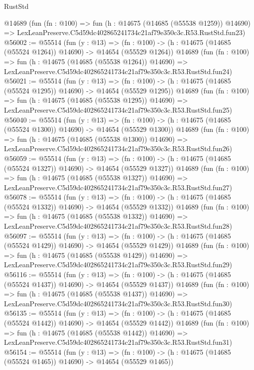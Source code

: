 \begin{lexlean}{RustStd}
\begin{coremodule}
    @14689
    (fun (fn : @100) =>
    fun (h : @14675 (@14685 (@55538 @1259)) @14690) =>
    LexLeanPreserve.C5d59dc402865241734c21af79e350c3c.R53.RustStd.fun23)
@56002 := @55514
    (fun (y : @13) =>
    (fn : @100) -> (h : @14675 (@14685 (@55524 @1264)) @14690) -> @14654 (@55529 @1264))
    @14689
    (fun (fn : @100) =>
    fun (h : @14675 (@14685 (@55538 @1264)) @14690) =>
    LexLeanPreserve.C5d59dc402865241734c21af79e350c3c.R53.RustStd.fun24)
@56021 := @55514
    (fun (y : @13) =>
    (fn : @100) -> (h : @14675 (@14685 (@55524 @1295)) @14690) -> @14654 (@55529 @1295))
    @14689
    (fun (fn : @100) =>
    fun (h : @14675 (@14685 (@55538 @1295)) @14690) =>
    LexLeanPreserve.C5d59dc402865241734c21af79e350c3c.R53.RustStd.fun25)
@56040 := @55514
    (fun (y : @13) =>
    (fn : @100) -> (h : @14675 (@14685 (@55524 @1300)) @14690) -> @14654 (@55529 @1300))
    @14689
    (fun (fn : @100) =>
    fun (h : @14675 (@14685 (@55538 @1300)) @14690) =>
    LexLeanPreserve.C5d59dc402865241734c21af79e350c3c.R53.RustStd.fun26)
@56059 := @55514
    (fun (y : @13) =>
    (fn : @100) -> (h : @14675 (@14685 (@55524 @1327)) @14690) -> @14654 (@55529 @1327))
    @14689
    (fun (fn : @100) =>
    fun (h : @14675 (@14685 (@55538 @1327)) @14690) =>
    LexLeanPreserve.C5d59dc402865241734c21af79e350c3c.R53.RustStd.fun27)
@56078 := @55514
    (fun (y : @13) =>
    (fn : @100) -> (h : @14675 (@14685 (@55524 @1332)) @14690) -> @14654 (@55529 @1332))
    @14689
    (fun (fn : @100) =>
    fun (h : @14675 (@14685 (@55538 @1332)) @14690) =>
    LexLeanPreserve.C5d59dc402865241734c21af79e350c3c.R53.RustStd.fun28)
@56097 := @55514
    (fun (y : @13) =>
    (fn : @100) -> (h : @14675 (@14685 (@55524 @1429)) @14690) -> @14654 (@55529 @1429))
    @14689
    (fun (fn : @100) =>
    fun (h : @14675 (@14685 (@55538 @1429)) @14690) =>
    LexLeanPreserve.C5d59dc402865241734c21af79e350c3c.R53.RustStd.fun29)
@56116 := @55514
    (fun (y : @13) =>
    (fn : @100) -> (h : @14675 (@14685 (@55524 @1437)) @14690) -> @14654 (@55529 @1437))
    @14689
    (fun (fn : @100) =>
    fun (h : @14675 (@14685 (@55538 @1437)) @14690) =>
    LexLeanPreserve.C5d59dc402865241734c21af79e350c3c.R53.RustStd.fun30)
@56135 := @55514
    (fun (y : @13) =>
    (fn : @100) -> (h : @14675 (@14685 (@55524 @1442)) @14690) -> @14654 (@55529 @1442))
    @14689
    (fun (fn : @100) =>
    fun (h : @14675 (@14685 (@55538 @1442)) @14690) =>
    LexLeanPreserve.C5d59dc402865241734c21af79e350c3c.R53.RustStd.fun31)
@56154 := @55514
    (fun (y : @13) =>
    (fn : @100) -> (h : @14675 (@14685 (@55524 @1465)) @14690) -> @14654 (@55529 @1465))

\end{coremodule}
\end{lexlean}
